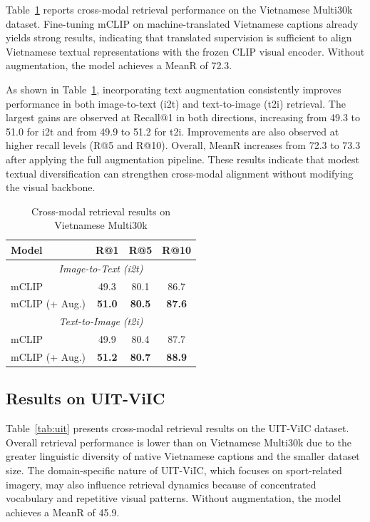 Table~\ref{tab:multi30k-results} reports cross-modal retrieval performance on the Vietnamese Multi30k dataset. Fine-tuning mCLIP on machine-translated Vietnamese captions already yields strong results, indicating that translated supervision is sufficient to align Vietnamese textual representations with the frozen CLIP visual encoder. Without augmentation, the model achieves a MeanR of 72.3.

As shown in Table~\ref{tab:multi30k-results}, incorporating text augmentation consistently improves performance in both image-to-text (i2t) and text-to-image (t2i) retrieval. The largest gains are observed at Recall@1 in both directions, increasing from 49.3 to 51.0 for i2t and from 49.9 to 51.2 for t2i. Improvements are also observed at higher recall levels (R@5 and R@10). Overall, MeanR increases from 72.3 to 73.3 after applying the full augmentation pipeline. These results indicate that modest textual diversification can strengthen cross-modal alignment without modifying the visual backbone.

\begin{table}[ht]
\centering
\caption{Cross-modal retrieval results on Vietnamese Multi30k}
\label{tab:multi30k-results}
\begin{tabular}{|l|c|c|c|}
\hline
\textbf{Model} & \textbf{R@1} & \textbf{R@5} & \textbf{R@10} \\
\hline
\multicolumn{4}{|c|}{\textit{Image-to-Text (i2t)}} \\
\hline
mCLIP & 49.3 & 80.1 & 86.7 \\
\hline
mCLIP (+ Aug.) & \textbf{51.0} & \textbf{80.5} & \textbf{87.6} \\
\hline
\multicolumn{4}{|c|}{\textit{Text-to-Image (t2i)}} \\
\hline
mCLIP & 49.9 & 80.4 & 87.7 \\
\hline
mCLIP (+ Aug.) & \textbf{51.2} & \textbf{80.7} & \textbf{88.9} \\
\hline
\end{tabular}
\end{table}


\subsection{Results on UIT-ViIC}

Table~\ref{tab:uit} presents cross-modal retrieval results on the UIT-ViIC dataset. Overall retrieval performance is lower than on Vietnamese Multi30k due to the greater linguistic diversity of native Vietnamese captions and the smaller dataset size. The domain-specific nature of UIT-ViIC, which focuses on sport-related imagery, may also influence retrieval dynamics because of concentrated vocabulary and repetitive visual patterns. Without augmentation, the model achieves a MeanR of 45.9.

